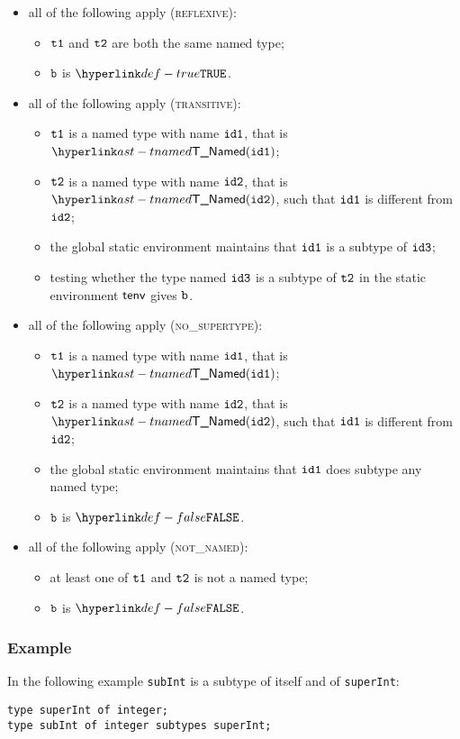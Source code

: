 \begin{itemize}
  \item all of the following apply (\textsc{reflexive}):
  \begin{itemize}
    \item $\texttt{t1}$ and $\texttt{t2}$ are both the same named type;
    \item $\texttt{b}$ is $\True$.
  \end{itemize}

  \item all of the following apply (\textsc{transitive}):
  \begin{itemize}
    \item $\texttt{t1}$ is a named type with name $\texttt{id1}$, that is $\TNamed(\idone)$;
    \item $\texttt{t2}$ is a named type with name $\texttt{id2}$, that is $\TNamed(\idtwo)$, such that $\texttt{id1}$ is different from $\texttt{id2}$;
    \item the global static environment maintains that $\texttt{id1}$ is a subtype of $\texttt{id3}$;
    \item testing whether the type named $\texttt{id3}$ is a subtype of $\texttt{t2}$ in the static environment $\textsf{tenv}$
    gives $\texttt{b}$.
  \end{itemize}

  \item all of the following apply (\textsc{no\_supertype}):
  \begin{itemize}
    \item $\texttt{t1}$ is a named type with name $\texttt{id1}$, that is $\TNamed(\idone)$;
    \item $\texttt{t2}$ is a named type with name $\texttt{id2}$, that is $\TNamed(\idtwo)$, such that $\texttt{id1}$ is different from $\texttt{id2}$;
    \item the global static environment maintains that $\texttt{id1}$ does subtype any named type;
    \item $\texttt{b}$ is $\False$.
  \end{itemize}

  \item all of the following apply (\textsc{not\_named}):
  \begin{itemize}
    \item at least one of $\texttt{t1}$ and $\texttt{t2}$ is not a named type;
    \item $\texttt{b}$ is $\False$.
  \end{itemize}
\end{itemize}
\subsubsection{Example}
In the following example \texttt{subInt} is a subtype of itself and of \texttt{superInt}:
\begin{verbatim}
type superInt of integer;
type subInt of integer subtypes superInt;
\end{verbatim}

